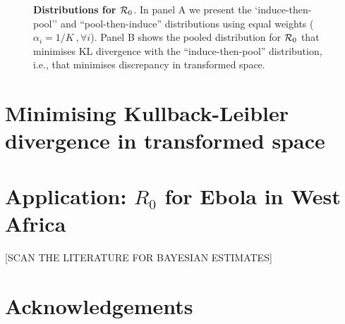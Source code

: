 \documentclass[11pt]{article}
\begin{document}
\begin{figure}
\begin{center}
\end{center}
\caption{
\textbf{Distributions for ${\cal R}_0$}.
In panel A we present the `induce-then-pool'' and ``pool-then-induce'' distributions using equal weights ($\alpha_i = 1/K \:, \forall i$).
Panel B shows the pooled distribution for ${\cal R}_0$ that minimises KL divergence with the ``induce-then-pool'' distribution, i.e., that minimises discrepancy in transformed space.
}
\label{fig:transformAndKL}
\end{figure}

\section{Minimising Kullback-Leibler divergence in transformed space}


\section{Application: $R_0$ for Ebola in West Africa}
[SCAN THE LITERATURE FOR BAYESIAN ESTIMATES]
\section*{Acknowledgements}

\end{document}
